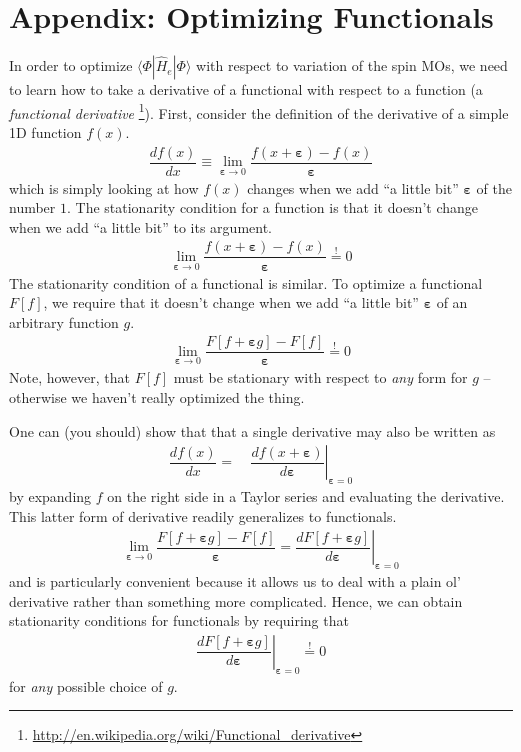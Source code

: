 \documentclass[11pt]{article}
\newcommand{\F}{\ensuremath{\Phi}}
\newcommand{\e}{\ensuremath{\bm{\varepsilon}}}
\newcommand{\op}[1]{\ensuremath{ \hat{#1} } }
\newcommand{\fr}[2]{\ensuremath{ \dfrac{#1}{#2} }}
\newcommand{\ip}[1]{\ensuremath{\langle #1\rangle}}
\theoremstyle{indented}
\begin{document}
\newpage
\section{Appendix: Optimizing Functionals}
\label{optimizing-functionals}
In order to optimize $\ip{\F|\op{H}_e|\F}$ with respect to variation of the spin MOs, we need to learn how to take a derivative of a functional with respect to a function (a {\it functional derivative} \footnote{\url{http://en.wikipedia.org/wiki/Functional_derivative}}).
First, consider the definition of the derivative of a simple 1D function $f(x)$.
\begin{align*}
	\fr{df(x)}{dx}
\equiv
\lim_{\e\rightarrow0}
	\fr{f(x+\e)-f(x)}{\e}
\end{align*}
which is simply looking at how $f(x)$ changes when we add ``a little bit'' $\e$ of the number $1$.
The stationarity condition for a function is that it doesn't change when we add ``a little bit'' to its argument.
\begin{align}
\lim_{\e\rightarrow0}
	\fr{f(x+\e)-f(x)}{\e}
\overset{!}=0
\end{align}
The stationarity condition of a functional is similar.
To optimize a functional $F[f]$, we require that it doesn't change when we add ``a little bit'' $\e$ of an arbitrary function $g$.
\begin{align}
\lim_{\e\rightarrow0}
	\fr{F[f+\e g]-F[f]}{\e}
\overset{!}=0
\end{align}
Note, however, that $F[f]$ must be stationary with respect to {\it any} form for $g$ -- otherwise we haven't really optimized the thing.

One can (you should) show that that a single derivative may also be written as
\begin{align}
	\fr{df(x)}{dx}
=&\
\left.
	\fr{df(x+\e)}{d\e}
\right|_{\e=0}
\end{align}
by expanding $f$ on the right side in a Taylor series and evaluating the derivative.
This latter form of derivative readily generalizes to functionals.
\begin{align}
\lim_{\e\rightarrow0}
	\fr{F[f+\e g]-F[f]}{\e}
=
\left.
	\fr{dF[f+\e g]}{d\e}
\right|_{\e=0}
\end{align}
and is particularly convenient because it allows us to deal with a plain ol' derivative rather than something more complicated.
Hence, we can obtain stationarity conditions for functionals by requiring that
\begin{align}
\left.
	\fr{dF[f+\e g]}{d\e}
\right|_{\e=0}
\overset{!}=
	0
\end{align}
for {\it any} possible choice of $g$.
\end{document}
